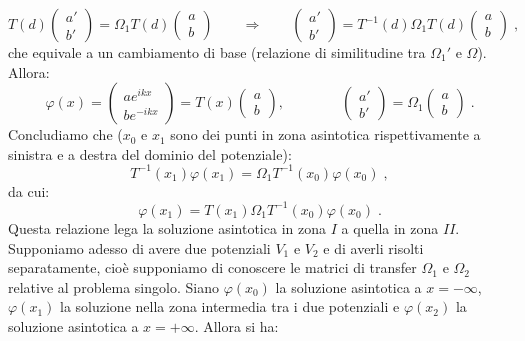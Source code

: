 \documentclass[12pt,a4paper]{report}
\theoremstyle{definition}
\numberwithin{equation}{section}
\begin{document}
\begin{equation}
T(d)\left(\begin{matrix}
a' \\
b'
\end{matrix}\right)=\Omega_1 T(d)\left(
\begin{matrix}
a \\
b
\end{matrix}\right) \qquad \Longrightarrow \qquad \left(
\begin{matrix}
a' \\
b'
\end{matrix}\right)=T^{-1}(d)\Omega_1 T(d)\left(
\begin{matrix}
a \\
b
\end{matrix}\right)\;,
\end{equation}
che equivale a un cambiamento di base (relazione di similitudine tra $\Omega_1'$ e $\Omega$). Allora:
$$
\varphi(x)=\left(
\begin{matrix}
ae^{ikx} \\
be^{-ikx}
\end{matrix}\right)=T(x)\left(
\begin{matrix}
a \\
b
\end{matrix}\right), \qquad \qquad
\left(\begin{matrix}
a' \\
b'
\end{matrix}\right)=\Omega_1\left(
\begin{matrix}
a \\
b
\end{matrix}\right)\;.
$$
Concludiamo che ($x_0$ e $x_1$ sono dei punti in zona asintotica rispettivamente a sinistra e a destra del dominio del potenziale):
\begin{equation}
T^{-1}(x_1)\varphi(x_1)=\Omega_1 T^{-1}(x_0)\varphi(x_0)\;,
\end{equation}
da cui:
\begin{equation}
\varphi(x_1)=T(x_1)\Omega_1 T^{-1}(x_0)\varphi(x_0)\;.
\end{equation}
Questa relazione lega la soluzione asintotica in zona $I$ a quella in zona $II$. \\
Supponiamo adesso di avere due potenziali $V_1$ e $V_2$ e di averli risolti separatamente, cioè supponiamo di conoscere le matrici di transfer $\Omega_1$ e $\Omega_2$ relative al problema singolo. Siano $\varphi(x_0)$ la soluzione asintotica a $x=-\infty$, $\varphi(x_1)$ la soluzione nella zona intermedia tra i due potenziali e $\varphi(x_2)$ la soluzione asintotica a $x=+\infty$. Allora si ha:
\end{document}

